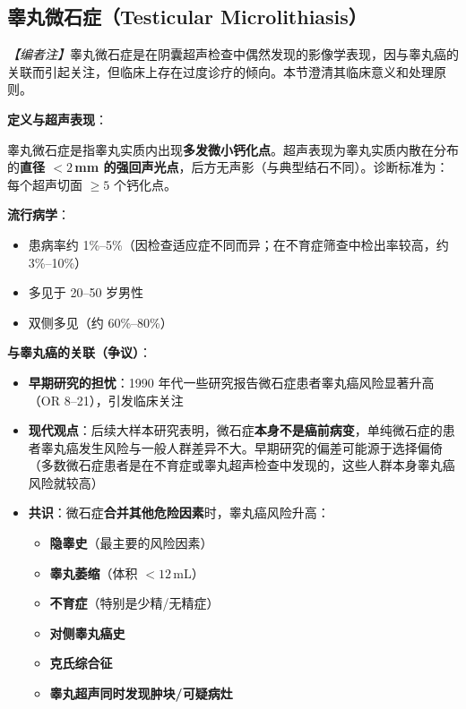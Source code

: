 \subsection{睾丸微石症（Testicular Microlithiasis）}
\label{subsec:microlithiasis}

\noindent\textit{【编者注】}睾丸微石症是在阴囊超声检查中偶然发现的影像学表现，因与睾丸癌的关联而引起关注，但临床上存在过度诊疗的倾向。本节澄清其临床意义和处理原则。

\vspace{0.5em}
\noindent\textbf{定义与超声表现}：

睾丸微石症是指睾丸实质内出现\textbf{多发微小钙化点}。超声表现为睾丸实质内散在分布的\textbf{直径 $<2\,$mm 的强回声光点}，后方无声影（与典型结石不同）。诊断标准为：每个超声切面 $\geq 5$ 个钙化点。

\vspace{0.5em}
\noindent\textbf{流行病学}：
\begin{itemize}[leftmargin=2cm]
	\item 患病率约 1\%--5\%（因检查适应症不同而异；在不育症筛查中检出率较高，约 3\%--10\%）
	\item 多见于 20--50 岁男性
	\item 双侧多见（约 60\%--80\%）
\end{itemize}

\vspace{0.5em}
\noindent\textbf{与睾丸癌的关联（争议）}：

\begin{itemize}[leftmargin=2cm]
	\item \textbf{早期研究的担忧}：1990 年代一些研究报告微石症患者睾丸癌风险显著升高（OR 8--21），引发临床关注
	\item \textbf{现代观点}：后续大样本研究表明，微石症\textbf{本身不是癌前病变}，单纯微石症的患者睾丸癌发生风险与一般人群差异不大。早期研究的偏差可能源于选择偏倚（多数微石症患者是在不育症或睾丸超声检查中发现的，这些人群本身睾丸癌风险就较高）
	\item \textbf{共识}：微石症\textbf{合并其他危险因素}时，睾丸癌风险升高：
	\begin{itemize}
		\item \textbf{隐睾史}（最主要的风险因素）
		\item \textbf{睾丸萎缩}（体积 $<12\,$mL）
		\item \textbf{不育症}（特别是少精/无精症）
		\item \textbf{对侧睾丸癌史}
		\item \textbf{克氏综合征}
		\item \textbf{睾丸超声同时发现肿块/可疑病灶}
	\end{itemize}
\end{itemize}

